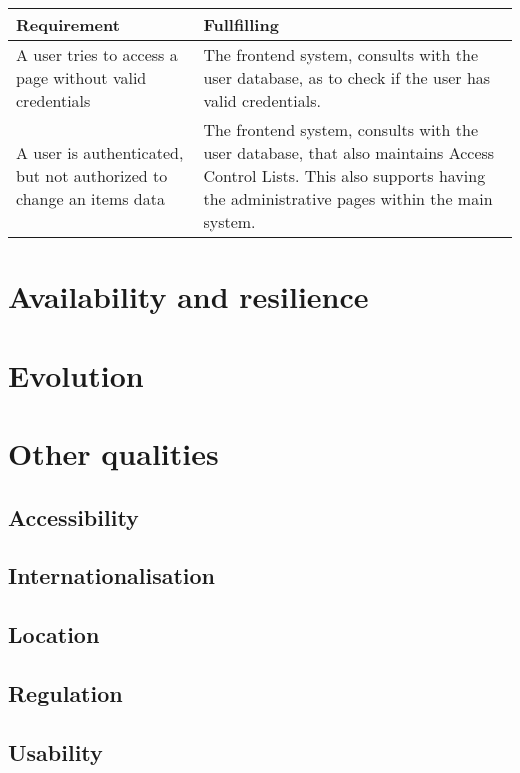 \begin{table}[ht]
\centering
\begin{tabular}{p{5cm} | p{7cm}}
Requirement & Fullfilling \\ \hline
A user tries to access a page without valid credentials &
    The frontend system, consults with the user database, as to check if the
    user has valid credentials. \\ \hline
A user is authenticated, but not authorized to change an items data &
    The frontend system, consults with the user database, that also maintains
    Access Control Lists. This also supports having the administrative pages
    within the main system. \\
\end{tabular}
\end{table}

\section{Availability and resilience}
\label{sec:avail-resil}



\section{Evolution}
\label{sec:evolution}


\section{Other qualities}
\label{sec:other-qualities}

\subsection{Accessibility}
\label{sec:accessibility}


\subsection{Internationalisation}
\label{sec:internationalisation}


\subsection{Location}
\label{sec:location}


\subsection{Regulation}
\label{sec:regulation}


\subsection{Usability}
\label{sec:usability}


